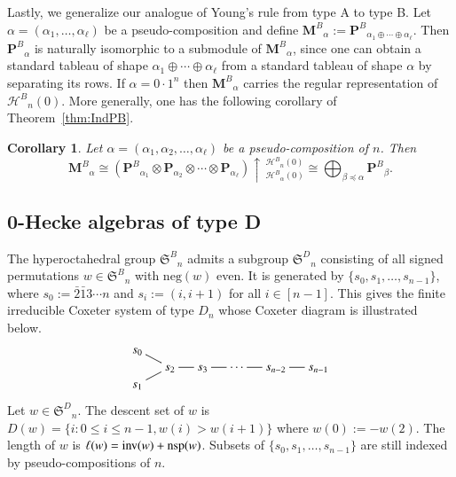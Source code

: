 \documentclass{amsart}
\newtheorem{corollary}[theorem]{Corollary}
\newtheorem*{Young's Rule}{Young's Rule}
\theoremstyle{definition}
\theoremstyle{remark}
\numberwithin{equation}{section}
\begin{document}
Lastly, we generalize our analogue of Young's rule from type A to type B. Let $\alpha=(\alpha_1,\ldots,\alpha_\ell)$ be a pseudo-composition and define ${\mathbf{M}^B}_\alpha := {\mathbf{P}^B}_{\alpha_1\oplus\cdots\oplus\alpha_\ell}$. Then ${\mathbf{P}^B}_\alpha$ is naturally isomorphic to a submodule of ${\mathbf{M}^B}_\alpha$, since one can obtain a standard tableau of shape $\alpha_1\oplus\cdots\oplus\alpha_\ell$ from a standard tableau of  shape $\alpha$ by separating its rows. If $\alpha=0\cdot 1^n$ then ${\mathbf{M}^B}_\alpha$ carries the regular representation of ${\mathcal{H}^B}_n(0)$. More generally, one has the following corollary of Theorem~\ref{thm:IndPB}.

\begin{corollary}
Let $\alpha=(\alpha_1,\alpha_2,\ldots,\alpha_\ell)$ be a pseudo-composition of $n$. Then 
\[ {\mathbf{M}^B}_\alpha\cong \left( {\mathbf{P}^B}_{\alpha_1} \otimes {\mathbf{P}}_{\alpha_2} \otimes\cdots \otimes {\mathbf{P}}_{\alpha_\ell} \right) \uparrow\,_{{\mathcal{H}^B}_\alpha(0)}^{{\mathcal{H}^B}_n(0)} \cong \bigoplus_{\beta{\operatorname{\preccurlyeq}}\alpha} {\mathbf{P}^B}_\beta. \]
\end{corollary}

\subsection{0-Hecke algebras of type D}\label{sec:H0D}

The hyperoctahedral group ${{\mathfrak S}^B}_n$ admits a subgroup ${{\mathfrak S}^D}_n$ consisting of all signed permutations $w\in{{\mathfrak S}^B}_n$ with ${\mathrm{neg}}(w)$ even. It is generated by $\{s_0,s_1,\ldots,s_{n-1}\}$, where $s_0:=\bar2\bar13\cdots n$ and $s_i:=(i,i+1)$ for all $i\in[n-1]$. This gives the finite irreducible Coxeter system of type $D_n$ whose Coxeter diagram is illustrated below.
\[ \xymatrix @R=2pt @C=12pt{
s_0 \ar@{-}[rd] \\
& s_2 \ar@{-}[r] & s_3 \ar@{-}[r] & \cdots \ar@{-}[r] & s_{n-2} \ar@{-}[r] & s_{n-1} \\
s_1 \ar@{-}[ru]
} \]
Let $w\in{{\mathfrak S}^D}_n$. The descent set of $w$ is $D(w)=\{i: 0\le i\le n-1, w(i)>w(i+1)\}$ where $w(0):=-w(2)$. The length of $w$ is $\ell(w)={{\rm inv}}(w)+{\mathrm{nsp}}(w)$.
Subsets of $\{s_0,s_1,\ldots,s_{n-1}\}$ are still indexed by pseudo-compositions of $n$.
\end{document}
